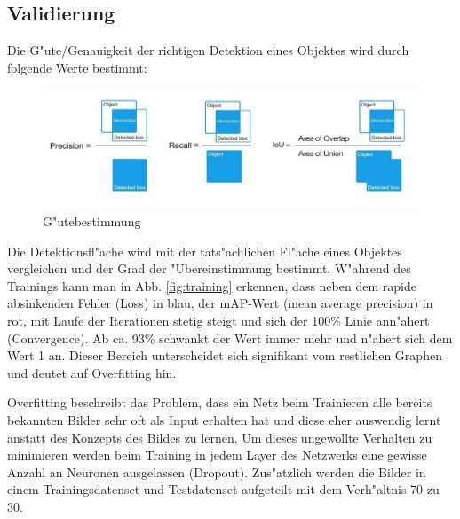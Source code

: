 \subsection{Validierung}
Die G"ute/Genauigkeit der richtigen Detektion eines Objektes wird durch folgende Werte bestimmt:

\begin{figure}[h]
	\centering
	\includegraphics[width=1.0\textwidth]{images/genauigkeit}
	\caption{G"utebestimmung}
	\label{fig:genauigkeit}
\end{figure}

Die Detektionsfl"ache wird mit der tats"achlichen Fl"ache eines Objektes vergleichen und der Grad der "Ubereinstimmung bestimmt. W"ahrend des Trainings kann man in Abb. \ref{fig:training} erkennen, dass neben dem rapide absinkenden Fehler (Loss) in blau, der mAP-Wert (mean average precision) in rot, mit Laufe der Iterationen stetig steigt und sich der 100\% Linie ann"ahert (Convergence). Ab ca. 93\% schwankt der Wert immer mehr und n"ahert sich dem Wert 1 an. Dieser Bereich unterscheidet sich signifikant vom restlichen Graphen und deutet auf Overfitting hin.

Overfitting beschreibt das Problem, dass ein Netz beim Trainieren alle bereits bekannten Bilder sehr oft als Input erhalten hat und diese eher auswendig lernt anstatt des Konzepts des Bildes zu lernen. Um dieses ungewollte Verhalten zu minimieren werden beim Training in jedem Layer des Netzwerks eine gewisse Anzahl an Neuronen ausgelassen (Dropout). Zus"atzlich werden die Bilder in einem Trainingsdatenset und Testdatenset aufgeteilt mit dem Verh"altnis 70 zu 30.

